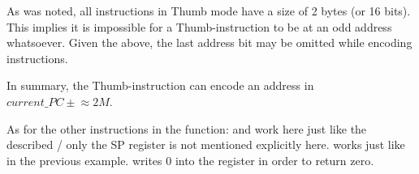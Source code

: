 As was noted, all instructions in Thumb mode have a size of 2 bytes (or 16 bits).
This implies it is impossible for a Thumb-instruction to be at an odd address whatsoever.
Given the above, the last address bit may be omitted while encoding instructions.

In summary, the  Thumb-instruction can encode an address in $current\_PC \pm{}\approx{}2M$.

As for the other instructions in the function: \PUSH and \POP work here just like the described / only the \ac{SP} register is not mentioned explicitly here.
 works just like in the previous example.
 writes 0 into the  register in order to return zero.

